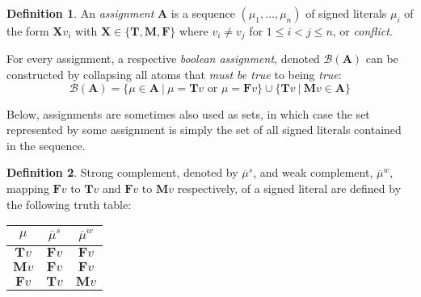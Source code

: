 \documentclass{vutinfth} %
\theoremstyle{example}
\theoremstyle{definition}
\newtheorem{definition}{Definition}[section]
\theoremstyle{theorem}
\theoremstyle{lemma}
\theoremstyle{corollary}
\newtheorem*{remark}{Remark}
\newcommand{\mbt}{must-be-true}
\newcommand{\negstrong}[1]{\overline{#1}^s}
\newcommand{\negweak}[1]{\overline{#1}^w}
\newcommand{\bass}{\mathcal{B}}
\newcommand{\ass}{\mathbf{A}}
\newcommand{\bT}{\mathbf{T}}
\newcommand{\bM}{\mathbf{M}}
\newcommand{\bF}{\mathbf{F}}
\newcommand{\bX}{\mathbf{X}}
\newcommand{\sgl}{\mu}
\newcommand{\bsgl}{\sigma}
\newcommand{\thrice}{{\{\bT, \bM, \bF \}}}
\newcommand{\wkn}{\textit{weaken}}
\begin{document}


\begin{definition}
An \emph{assignment} $\ass$ is a sequence $(\sgl_1, \ldots, \sgl_n)$ of signed literals $\sgl_i$ of the form $\bX v_i$ with $\bX \in \thrice$ where $v_i \not = v_j$ for $1 \leq i < j \leq n$, or \emph{conflict}.

For every assignment, a respective \emph{boolean assignment}, denoted $\bass(\ass)$ can be constructed by collapsing all atoms that \emph{must be true} to being \emph{true}:$$\bass(\ass) = \{ \sgl \in \ass \ | \ \sgl = \bT v \textrm{ or } \sgl = \bF v \} \cup \{ \bT v \ | \ \bM v \in \ass \}$$
\end{definition}

Below, assignments are sometimes also used as sets, in which case the set represented by some assignment is simply the set of all signed literals contained in the sequence.

\begin{definition}
Strong complement, denoted by $\negstrong{\sgl}$, and weak complement, $\negweak{\sgl}$, mapping $\bF v$ to $\bT v$ and $\bF v$ to $\bM v$ respectively, of a signed literal are defined by the following truth table:%

\begin{center}
\begin{tabular}{|c|cc|}
\hline
$\sgl$&$\negstrong{\sgl}$&$\negweak{\sgl}$\\
\hline
\hline
$\bT v$&$\bF v$&$\bF v$\\
$\bM v$&$\bF v$&$\bF v$\\
$\bF v$&$\bT v$&$\bM v$\\
\hline
\end{tabular}
\end{center}
\end{definition}
\end{document}
